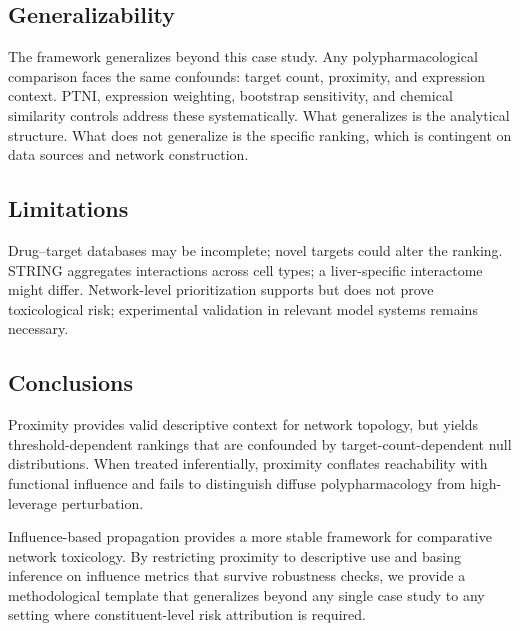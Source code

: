 \subsection{Generalizability}

The framework generalizes beyond this case study.
Any polypharmacological comparison faces the same confounds: target count, proximity, and expression context.
PTNI, expression weighting, bootstrap sensitivity, and chemical similarity controls address these systematically.
What generalizes is the analytical structure.
What does not generalize is the specific ranking, which is contingent on data sources and network construction.

\subsection{Limitations}

Drug--target databases may be incomplete; novel targets could alter the ranking.
STRING aggregates interactions across cell types; a liver-specific interactome might differ.
Network-level prioritization supports but does not prove toxicological risk; experimental validation in relevant model systems remains necessary.

\subsection{Conclusions}

Proximity provides valid descriptive context for network topology, but yields threshold-dependent rankings that are confounded by target-count-dependent null distributions.
When treated inferentially, proximity conflates reachability with functional influence and fails to distinguish diffuse polypharmacology from high-leverage perturbation.

Influence-based propagation provides a more stable framework for comparative network toxicology.
By restricting proximity to descriptive use and basing inference on influence metrics that survive robustness checks, we provide a methodological template that generalizes beyond any single case study to any setting where constituent-level risk attribution is required.

